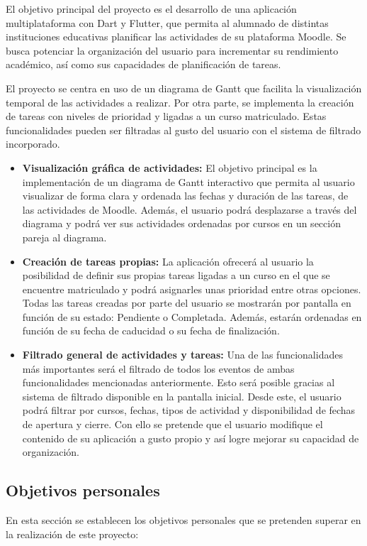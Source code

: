 
El objetivo principal del proyecto es el desarrollo de una aplicación multiplataforma con Dart y Flutter, que permita al alumnado de distintas instituciones educativas planificar las actividades de su plataforma Moodle. Se busca potenciar la organización del usuario para incrementar su rendimiento académico, así como sus capacidades de planificación de tareas.

El proyecto se centra en uso de un diagrama de Gantt que facilita la visualización temporal de las actividades a realizar. Por otra parte, se implementa la creación de tareas con niveles de prioridad y ligadas a un curso matriculado. Estas funcionalidades pueden ser filtradas al gusto del usuario con el sistema de filtrado incorporado.

\begin{itemize}
    \item \textbf{Visualización gráfica de actividades:} El objetivo principal es la implementación de un diagrama de Gantt interactivo que permita al usuario visualizar de forma clara y ordenada las fechas y duración de las tareas, de las actividades de Moodle. Además, el usuario podrá desplazarse a través del diagrama y podrá ver sus actividades ordenadas por cursos en un sección pareja al diagrama.
    \item \textbf{Creación de tareas propias:} La aplicación ofrecerá al usuario la posibilidad de definir sus propias tareas ligadas a un curso en el que se encuentre matriculado y podrá asignarles unas prioridad entre otras opciones. Todas las tareas creadas por parte del usuario se mostrarán por pantalla en función de su estado: Pendiente o Completada. Además, estarán ordenadas en función de su fecha de caducidad o su fecha de finalización.
    \item \textbf{Filtrado general de actividades y tareas:} Una de las funcionalidades más importantes será el filtrado de todos los eventos de ambas funcionalidades mencionadas anteriormente. Esto será posible gracias al sistema de filtrado disponible en la pantalla inicial. Desde este, el usuario podrá filtrar por cursos, fechas, tipos de actividad y disponibilidad de fechas de apertura y cierre. Con ello se pretende que el usuario modifique el contenido de su aplicación a gusto propio y así logre mejorar su capacidad de organización.
\end{itemize}

\subsection{Objetivos personales}
En esta sección se establecen los objetivos personales que se pretenden superar en la realización de este proyecto:

